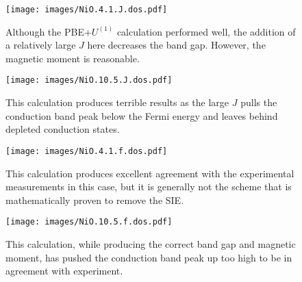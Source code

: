 \begin{figure}[th!]
\centering
\texttt{[image: images/NiO.4.1.J.dos.pdf]}
\caption[NiO DOS with $U=4.1$~eV and $J=2.82$]
{Although the PBE+$U^{(1)}$ calculation performed well, 
the addition of a relatively large $J$ here decreases 
the band gap. 
However, the magnetic moment is reasonable.}
\label{fig:NiO.4.1.J.dos}
\end{figure}

\begin{figure}[th!]
\centering
\texttt{[image: images/NiO.10.5.J.dos.pdf]}
\caption[NiO DOS with $U=10.5$~eV and $J=5.9$]
{This calculation produces terrible results as the large $J$ pulls 
the conduction band peak below the Fermi energy 
and leaves behind depleted conduction states.}
\label{fig:NiO.10.5.J.dos}
\end{figure}
\newpage

\begin{figure}[th!]
\centering
\texttt{[image: images/NiO.4.1.f.dos.pdf]}
\caption[NiO DOS with $U=4.1$~eV and $F_J=0.78$]
{This calculation produces excellent agreement 
with the experimental measurements in this case,
 but it is generally not the scheme that is mathematically 
 proven to remove the SIE.}
\label{fig:NiO.4.1.f.dos}
\end{figure}



\begin{figure}[th!]
\centering
\texttt{[image: images/NiO.10.5.f.dos.pdf]}
\caption[NiO DOS with $U=10.5$~eV and $F_J=0.69$]
{This calculation, while producing the correct band gap 
and magnetic moment, has pushed the conduction band 
peak up too high to be in agreement with experiment.}
\label{fig:NiO.10.5.f.dos}
\end{figure}
\newpage




